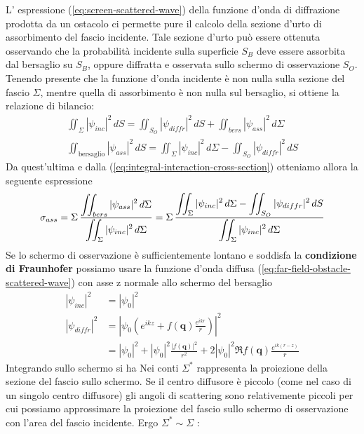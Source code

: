 L' espressione (\ref{eq:screen-scattered-wave}) della funzione d'onda di diffrazione prodotta da un ostacolo ci permette pure il calcolo della sezione d'urto di assorbimento del fascio incidente.
Tale sezione d'urto può essere ottenuta osservando che la probabilità incidente sulla superficie $S_B$ deve essere assorbita dal bersaglio su $S_B$, oppure diffratta e osservata sullo schermo di osservazione $S_O$.
Tenendo presente che la funzione d'onda incidente è non nulla sulla sezione del fascio $\Sigma$, mentre quella di assorbimento è non nulla sul bersaglio, si ottiene la relazione di bilancio:
\begin{gather*}
	\iint_{\Sigma} |\psi_{inc}|^2 \, dS =
	\iint_{S_O} |\psi_{diffr}|^2 \, dS +
	\iint_{bers} |\psi_{ass}|^2 \, d \Sigma\\
	\iint_{\text{bersaglio}} |\psi_{ass}|^2 \, dS =
	\iint_{\Sigma} |\psi_{inc}|^2 \, d\Sigma -
	\iint_{S_O} |\psi_{diffr}|^2 \, dS
\end{gather*}
Da quest'ultima e dalla (\ref{eq:integral-interaction-cross-section}) otteniamo allora la seguente espressione
\[
	\sigma_{ass} =\Sigma \, \fraclarg{\iint_{bers} |\psi_{ass}|^2 \, d \Sigma}{\iint_{\Sigma} |\psi_{inc}|^2 \, d \Sigma}
	= \Sigma \, \fraclarg{\iint_{\Sigma} |\psi_{inc}|^2 \, d\Sigma -
		\iint_{S_O} |\psi_{diffr}|^2 \, dS}{\iint_{\Sigma} |\psi_{inc}|^2 \, d \Sigma}
\]
Se lo schermo di osservazione è sufficientemente lontano e soddisfa la \textbf{condizione di Fraunhofer} possiamo usare la
funzione d'onda diffusa (\ref{eq:far-field-obstacle-scattered-wave}) con asse z normale allo schermo del bersaglio
\begin{align*}
	|\psi_{inc}|^2   & = |\psi_0|^2                                                                                           \\
	|\psi_{diffr}|^2 & = \left | \psi_0 \left( e^{ikz} + f(\bm{q})\frac{e^{ikr}}{r} \right) \right|^2                         \\
	                 & =  |\psi_0|^2 + |\psi_0|^2 \frac{|f(\bm{q})|^2}{r^2} + 2 |\psi_0|^2 \Re f(\bm{q})\frac{e^{ik(r-z)}}{r}
\end{align*}
Integrando sullo schermo si ha\sidenote
{
	Nei conti $ \Sigma^*$ rappresenta la proiezione della sezione del fascio sullo schermo. Se il centro diffusore è piccolo
	(come nel caso di un singolo centro diffusore) gli angoli di scattering sono relativemente piccoli per cui
 possiamo approssimare la proiezione del fascio sullo schermo di osservazione con l’area del fascio incidente.
Ergo $ \Sigma^* \sim \Sigma$
}:
